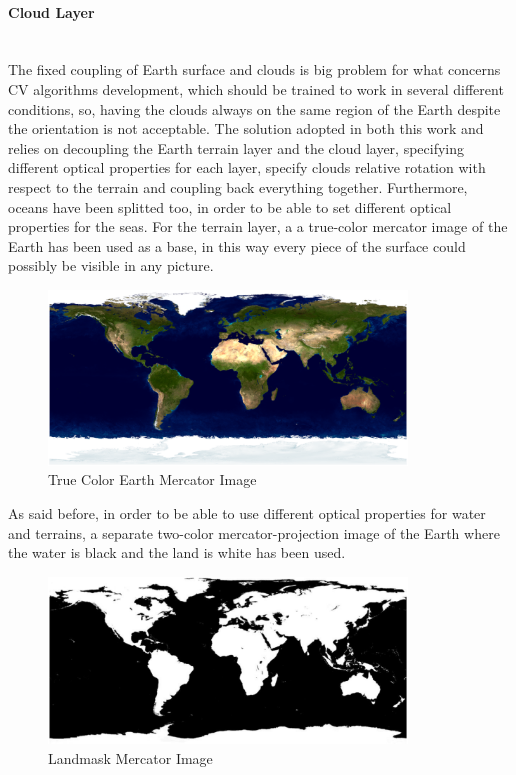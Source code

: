 \paragraph{Cloud Layer}\mbox{}\\
The fixed coupling of Earth surface and clouds is big problem for what concerns CV algorithms development, which should be trained to work in several different conditions, so, having the clouds always on the same region of the Earth despite the orientation is not acceptable.
The solution adopted in both this work and \cite{jacopo} relies on decoupling the Earth terrain layer and the cloud layer, specifying different optical properties for each layer, specify clouds relative rotation with respect to the terrain and coupling back everything together.
Furthermore, oceans have been splitted too, in order to be able to set different optical properties for the seas.
For the terrain layer, a a true-color mercator image of the Earth has been used as a base, in this way every piece of the surface could possibly be visible in any picture.

\begin{figure}
  \centering
  \includegraphics[width=0.85\textwidth]{gfx/earthMercator.eps}
  \caption{True Color Earth Mercator Image \cite{bluemarble}}
  \label{fig:EarthMercator}
\end{figure}

As said before, in order to be able to use different optical properties for water and terrains, a separate two-color mercator-projection image of the Earth where the water is black and the land is white has been used.

\begin{figure}
  \centering
  \includegraphics[width=0.85\textwidth]{gfx/landmask_mercator.eps}
  \caption{Landmask Mercator Image}
  \label{fig:LandmaskMercator}
\end{figure}

